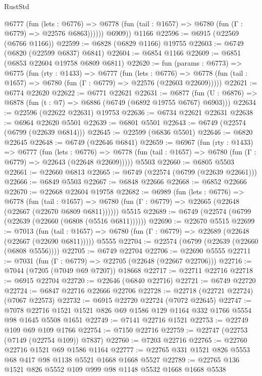 \begin{lexlean}{RustStd}
\begin{coremodule}
            @6777
              (fun (lets : @6776) =>
              @6778 (fun (tail : @1657) => @6780 (fun (Γ : @6779) => @22576 @6863))))))
        @6909))
    @1166
@22596 := @6915 (@22569 (@6766 @1166))
@22599 := @6828 (@6829 @1166) @19755
@22603 := @6749 (@6820 (@22599 @6837) @6841)
@22604 := @6854 @1166
@22609 := @6851 (@6853 @22604 @19758 @6809 @6811)
@22620 := fun (params : @6773) =>
  @6775
    (fun (rty : @1433) =>
    @6777
      (fun (lets : @6776) =>
      @6778 (fun (tail : @1657) => @6780 (fun (Γ : @6779) => @22576 (@22603 @22609)))))
@22621 := @6774 @22620
@22622 := @6771 @22621
@22631 := @6877
    (fun (U : @6876) => @6878 (fun (t : @7) => @6886 (@6749 (@6892 @19755 @6767) @6903)))
@22634 := @22596 (@22622 @22631) @19753
@22636 := @6734 @22621 @22631
@22638 := @6964 @22620 @5501
@22639 := @6801 @5501
@22643 := @6749 (@22574 (@6799 (@22639 @6814)))
@22645 := @22599 (@6836 @5501)
@22646 := @6820 @22645
@22648 := @6749 (@22646 @6841)
@22659 := @6967
    (fun (rty : @1433) =>
    @6777
      (fun (lets : @6776) =>
      @6778 (fun (tail : @1657) => @6780 (fun (Γ : @6779) => @22643 (@22648 @22609)))))
    @5503
@22660 := @6805 @5503
@22661 := @22660 @6813
@22665 := @6749 (@22574 (@6799 (@22639 @22661)))
@22666 := @6849 @5503
@22667 := @6848 @22666
@22668 := @6852 @22666
@22670 := @22668 @22604 @19758
@22682 := @6989
    (fun (lets : @6776) =>
    @6778
      (fun (tail : @1657) =>
      @6780 (fun (Γ : @6779) => @22665 (@22648 (@22667 (@22670 @6809 @6811))))))
    @5515
@22689 := @6749 (@22574 (@6799 (@22639 (@22660 (@6808 (@5516 @6811))))))
@22690 := @22670 @5515
@22699 := @7013
    (fun (tail : @1657) => @6780 (fun (Γ : @6779) => @22689 (@22648 (@22667 (@22690 @6811)))))
    @5555
@22704 := @22574 (@6799 (@22639 (@22660 (@6808 @5556))))
@22705 := @6749 @22704
@22706 := @22690 @5555
@22711 := @7031 (fun (Γ : @6779) => @22705 (@22648 (@22667 @22706)))
@22716 := @7044 (@7205 (@7049 @69 @7207)) @18668
@22717 := @22711 @22716
@22718 := @6915 @22704
@22720 := @22646 (@6840 @22716)
@22721 := @6749 @22720
@22724 := @6847 @22716 @22666 @22706
@22728 := @22718 (@22721 @22724) (@7067 @22573)
@22732 := @6915 @22720 @22724 (@7072 @22645)
@22747 := @7078 @22716 @1521 @1521 @826 @69 @1586 @129 @1164 @332 @1766 @5554 @98 @1645 @5508 @1651
@22749 := @7141 @22716 @1521
@22753 := @22749 @109 @69 @109 @1766
@22754 := @7150 @22716
@22759 := @22747 (@22753 (@7149 (@22754 @109)) @7837)
@22760 := @7203 @22716
@22765 := @22760 @22716 @1521 @69 @1586 @1164
@22777 := @22765 @331 @1521 @826 @5553 @68 @417 @98 @1138 @5521 @1668 @1668 @5527
@22789 := @22765 @136 @1521 @826 @5552 @109 @999 @98 @1148 @5532 @1668 @1668 @5538

\end{coremodule}
\end{lexlean}
